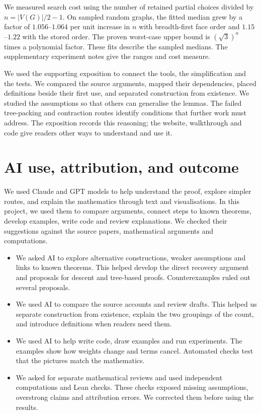 \documentclass[11pt,a4paper]{article}
\begin{document}
We measured search cost using the number of retained partial choices divided by $n=|V(G)|/2-1$. On sampled random graphs, the fitted median grew by a factor of $1.056$--$1.064$ per unit increase in $n$ with breadth-first face order and $1.15$--$1.22$ with the stored order. The proven worst-case upper bound is $(\sqrt{3})^n$ times a polynomial factor. These fits describe the sampled medians. The supplementary experiment notes give the ranges and cost measure.

We used the supporting exposition to connect the tools, the simplification and the tests. We compared the source arguments, mapped their dependencies, placed definitions beside their first use, and separated construction from existence. We studied the assumptions so that others can generalise the lemmas. The failed tree-packing and contraction routes identify conditions that further work must address. The exposition records this reasoning; the website, walkthrough and code give readers other ways to understand and use it.

\newpage
\section{AI use, attribution, and outcome}
We used Claude and GPT models to help understand the proof, explore simpler routes, and explain the mathematics through text and visualisations. In this project, we used them to compare arguments, connect steps to known theorems, develop examples, write code and review explanations. We checked their suggestions against the source papers, mathematical arguments and computations.

\begin{itemize}
\item We asked AI to explore alternative constructions, weaker assumptions and links to known theorems. This helped develop the direct recovery argument and proposals for descent and tree-based proofs. Counterexamples ruled out several proposals.
\item We used AI to compare the source accounts and review drafts. This helped us separate construction from existence, explain the two groupings of the count, and introduce definitions when readers need them.
\item We used AI to help write code, draw examples and run experiments. The examples show how weights change and terms cancel. Automated checks test that the pictures match the mathematics.
\item We asked for separate mathematical reviews and used independent computations and Lean checks. These checks exposed missing assumptions, overstrong claims and attribution errors. We corrected them before using the results.
\end{itemize}
\end{document}
